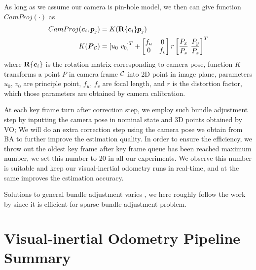 As long as we assume our camera is pin-hole model, we then can give function $CamProj(\cdot)$ as
\begin{align}
	\label{c2}
	CamProj(\boldsymbol{c}_i, \boldsymbol{p}_j) &= K (\mathbf{R} \{ \boldsymbol{c}_i \} \boldsymbol{p}_j) \\
	K(\boldsymbol{P}_{\mathcal{C}}) &= \left[ u_0 \ v_0 \right]^T + \begin{bmatrix} f_u & 0 \\
															 0 & f_v
											  \end{bmatrix} r \left[ \frac{P_x}{P_z} \ \frac{P_y}{P_z} \right]^T
\end{align}
where $\mathbf{R} \{ \boldsymbol{c}_i \}$ is the rotation matrix corresponding to camera pose, function $K$ transforms a point $P$ in camera frame $\mathcal{C}$ into 2D point in image plane, parameters $u_0$, $v_0$ are principle point, $f_u$, $f_v$ are focal length, and $r$ is the distortion factor, which those parameters are obtained by camera calibration.

At each key frame turn after correction step, we employ such bundle adjustment step by inputting the camera pose in nominal state and 3D points obtained by VO; We will do an extra correction step using the camera pose we obtain from BA to further improve the estimation quality. In order to ensure the efficiency, we throw out the oldest key frame after key frame queue has been reached maximum number, we set this number to 20 in all our experiments. We observe this number is suitable and keep our visual-inertial odometry runs in real-time, and at the same improves the estimation accuracy.

Solutions to general bundle adjustment varies \cite{wu2011multicore, triggs1999bundle, lourakis2009sba}, we here roughly follow the work by \cite{wu2011multicore} since it is efficient for sparse bundle adjustment problem.

\section{Visual-inertial Odometry Pipeline Summary}
\label{sec:pipeline_summary}

